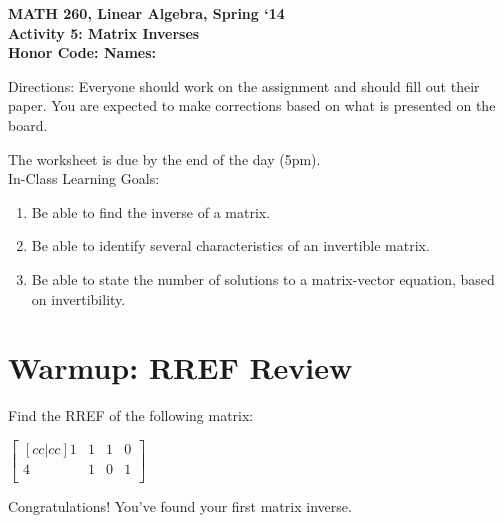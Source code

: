 \documentclass{article}
\begin{document}
\begin{flushleft}
	\bfseries{MATH 260, Linear Algebra, Spring `14}\\
	\bfseries{Activity 5:  Matrix Inverses}\\
	\bfseries{Honor Code:} \hspace{3.5in}\bfseries{Names:}\\
\end{flushleft}
\begin{flushleft}
\vspace{.75in}
Directions:  Everyone should work on the assignment and should fill out their paper.  You are expected to make corrections based on what is presented on the board.  \\
\begin{center} \large The worksheet is due by the end of the day (5pm). \normalsize \\

\vspace{0.1in}
\Large
In-Class Learning Goals:\\
\normalsize
\begin{enumerate}
\item Be able to find the inverse of a matrix.
\item Be able to identify several characteristics of an invertible matrix. 
\item Be able to state the number of solutions to a matrix-vector equation, based on invertibility.
\end{enumerate}
\vspace{0.1in}
\section*{Warmup: RREF Review}
\end{center}

Find the RREF of the following matrix:\\
\begin{center}
$\begin{bmatrix}[cc|cc]
1 & 1 &  1 & 0 \\
4 & 1 &  0 & 1 \\

\end{bmatrix}
$\\
\end{center}
\vspace{2in}
Congratulations! You've found your first matrix inverse.
\newpage
\begin{center}

\end{center}
\end{flushleft}
\end{document}
